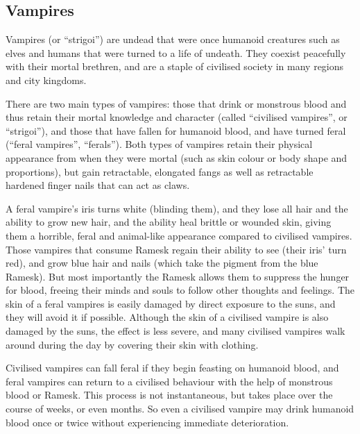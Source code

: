 \clearpage
{}
\clearpage

\subsection{Vampires}
\label{sec:Vampires}

Vampires (or ``strigoi'') are undead that were once humanoid creatures such as
elves and humans that were turned to a life of undeath. They coexist
peacefully with their mortal brethren, and are a staple of civilised society
in many regions and city kingdoms.

There are two main types of vampires: those that drink  or
monstrous blood and thus retain their mortal knowledge and character (called
``civilised vampires'', or ``strigoi''), and those that have fallen for
humanoid blood, and have turned feral (``feral vampires'', ``ferals''). Both
types of vampires retain their physical appearance from when they were mortal
(such as skin colour or body shape and proportions), but gain retractable,
elongated fangs as well as retractable hardened finger nails that can act as
claws.

A feral vampire's iris turns white (blinding them), and they lose all hair and
the ability to grow new hair, and the ability heal brittle or wounded skin,
giving them a horrible, feral and animal-like appearance compared to civilised
vampires. Those vampires that consume Ramesk regain their ability to see
(their iris' turn red), and grow blue hair and nails (which take the pigment
from the blue Ramesk). But most importantly the Ramesk allows them to suppress
the hunger for blood, freeing their minds and souls to follow other thoughts
and feelings. The skin of a feral vampires is easily damaged by direct
exposure to the suns, and they will avoid it if possible. Although the skin of
a civilised vampire is also damaged by the suns, the effect is less severe,
and many civilised vampires walk around during the day by covering their skin
with clothing.

Civilised vampires can fall feral if they begin feasting on humanoid blood,
and feral vampires can return to a civilised behaviour with the help of
monstrous blood or Ramesk. This process is not instantaneous, but takes place
over the course of weeks, or even months. So even a civilised vampire may
drink humanoid blood once or twice without experiencing immediate
deterioration.

